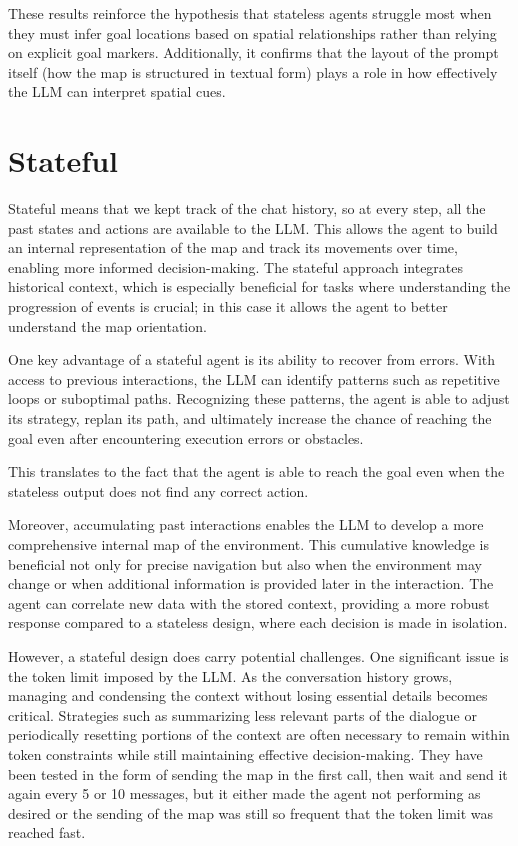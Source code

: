 These results reinforce the hypothesis that stateless agents struggle most when they
must infer goal locations based on spatial relationships rather than relying on explicit
goal markers. Additionally, it confirms that the layout of the prompt itself (how
the map is structured in textual form) plays a role in how effectively the LLM can
interpret spatial cues.

\section{Stateful}
\label{sec:stateful}

Stateful means that we kept track of the chat history, so at every step, all the
past states and actions are available to the LLM. This allows the agent to build
an internal representation of the map and track its movements over time,
enabling more informed decision-making. The stateful approach integrates historical
context, which is especially beneficial for tasks where understanding the
progression of events is crucial; in this case it allows the agent to better understand
the map orientation.

One key advantage of a stateful agent is its ability to recover from errors.
With access to previous interactions, the LLM can identify patterns such as repetitive
loops or suboptimal paths. Recognizing these patterns, the agent is able to adjust
its strategy, replan its path, and ultimately increase the chance of reaching the
goal even after encountering execution errors or obstacles.

This translates to the fact that the agent is able to reach the goal even when the
stateless output does not find any correct action.

Moreover, accumulating past interactions enables the LLM to develop a more
comprehensive internal map of the environment. This cumulative knowledge is beneficial
not only for precise navigation but also when the environment may change or when
additional information is provided later in the interaction. The agent can
correlate new data with the stored context, providing a more robust response compared
to a stateless design, where each decision is made in isolation.

However, a stateful design does carry potential challenges. One significant
issue is the token limit imposed by the LLM. As the conversation history grows,
managing and condensing the context without losing essential details becomes
critical. Strategies such as summarizing less relevant parts of the dialogue or periodically
resetting portions of the context are often necessary to remain within token constraints
while still maintaining effective decision-making. They have been tested in the
form of sending the map in the first call, then wait and send it again every 5 or
10 messages, but it either made the agent not performing as desired or the
sending of the map was still so frequent that the token limit was reached fast.

